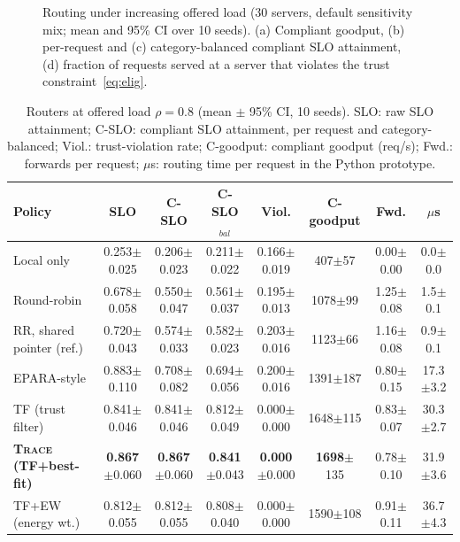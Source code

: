 \documentclass[journal]{IEEEtran}
\newcommand{\sys}{\textsc{Trace}}
\begin{document}
\begin{figure}[t]
\centering
\resizebox{\textwidth}{!}{%
}
\caption{Routing under increasing offered load (30 servers, default sensitivity mix; mean and 95\% CI over 10 seeds). (a) Compliant goodput, (b) per-request and (c) category-balanced compliant SLO attainment, (d) fraction of requests served at a server that violates the trust constraint~\eqref{eq:elig}.}
\label{fig:load}
\end{figure}

\begin{table}[t]
\centering
\caption{Routers at offered load $\rho=0.8$ (mean $\pm$ 95\% CI, 10 seeds). SLO: raw SLO attainment; C-SLO: compliant SLO attainment, per request and category-balanced; Viol.: trust-violation rate; C-goodput: compliant goodput (req/s); Fwd.: forwards per request; $\mu$s: routing time per request in the Python prototype.}
\label{tab:main}
\footnotesize
\begin{tabular}{lccccccc}
\toprule
Policy & SLO & C-SLO & C-SLO$_{bal}$ & Viol. & C-goodput & Fwd. & $\mu$s \\
\midrule
Local only & 0.253$\pm$0.025 & 0.206$\pm$0.023 & 0.211$\pm$0.022 & 0.166$\pm$0.019 & 407$\pm$57 & 0.00$\pm$0.00 & 0.0$\pm$0.0 \\
Round-robin & 0.678$\pm$0.058 & 0.550$\pm$0.047 & 0.561$\pm$0.037 & 0.195$\pm$0.013 & 1078$\pm$99 & 1.25$\pm$0.08 & 1.5$\pm$0.1 \\
RR, shared pointer (ref.) & 0.720$\pm$0.043 & 0.574$\pm$0.033 & 0.582$\pm$0.023 & 0.203$\pm$0.016 & 1123$\pm$66 & 1.16$\pm$0.08 & 0.9$\pm$0.1 \\
EPARA-style & 0.883$\pm$0.110 & 0.708$\pm$0.082 & 0.694$\pm$0.056 & 0.200$\pm$0.016 & 1391$\pm$187 & 0.80$\pm$0.15 & 17.3$\pm$3.2 \\
TF (trust filter) & 0.841$\pm$0.046 & 0.841$\pm$0.046 & 0.812$\pm$0.049 & 0.000$\pm$0.000 & 1648$\pm$115 & 0.83$\pm$0.07 & 30.3$\pm$2.7 \\
\textbf{\sys{} (TF+best-fit)} & \textbf{0.867}$\pm$0.060 & \textbf{0.867}$\pm$0.060 & \textbf{0.841}$\pm$0.043 & \textbf{0.000}$\pm$0.000 & \textbf{1698}$\pm$135 & 0.78$\pm$0.10 & 31.9$\pm$3.6 \\
TF+EW (energy wt.) & 0.812$\pm$0.055 & 0.812$\pm$0.055 & 0.808$\pm$0.040 & 0.000$\pm$0.000 & 1590$\pm$108 & 0.91$\pm$0.11 & 36.7$\pm$4.3 \\
\bottomrule
\end{tabular}
\end{table}
\end{document}
